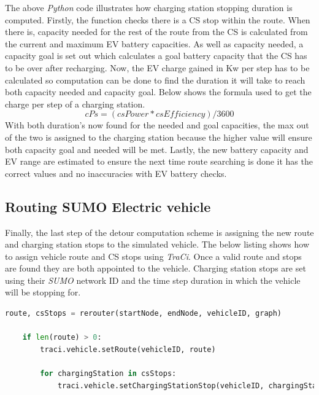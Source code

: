 \documentclass[11pt]{report}
\begin{document}
The above \emph{Python} code illustrates how charging station stopping duration is computed. Firstly, the function checks there is a CS stop within the route. When there is, capacity needed for the rest of the route from the CS is calculated from the current and maximum EV battery capacities. As well as capacity needed, a capacity goal is set out which calculates a goal battery capacity that the CS has to be over after recharging. Now, the EV charge gained in Kw per step has to be calculated so computation can be done to find the duration it will take to reach both capacity needed and capacity goal. Below shows the formula used to get the charge per step of a charging station.
\begin{equation} \label{eq:9}
    cPs=(csPower*csEfficiency)/3600 
\end{equation}
With both duration's now found for the needed and goal capacities, the max out of the two is assigned to the charging station because the higher value will ensure both capacity goal and needed will be met. Lastly, the new battery capacity and EV range are estimated to ensure the next time route searching is done it has the correct values and no inaccuracies with EV battery checks.

\subsection{Routing SUMO Electric vehicle}

Finally, the last step of the detour computation scheme is assigning the new route and charging station stops to the simulated vehicle. The below listing shows how to assign vehicle route and CS stops using \emph{TraCi}. Once a valid route and stops are found they are both appointed to the vehicle. Charging station stops are set using their \emph{SUMO} network ID and the time step duration in which the vehicle will be stopping for.

\begin{lstlisting}[language=Python, caption=Functionality to assign new route and CS stops, label={lst:17}]
    route, csStops = rerouter(startNode, endNode, vehicleID, graph)

    if len(route) > 0:
        traci.vehicle.setRoute(vehicleID, route)

        for chargingStation in csStops:
            traci.vehicle.setChargingStationStop(vehicleID, chargingStation.id, duration=chargingStation.Duration)
\end{lstlisting}
\end{document}

